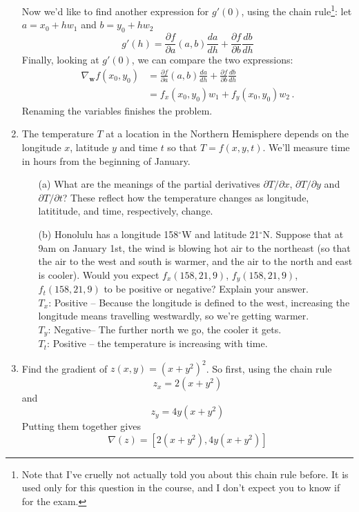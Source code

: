 \documentclass[11pt,a4paper]{scrartcl}
\begin{document}
\begin{enumerate}
Now we'd like to find another expression for $g'(0)$, using the chain rule\footnote{Note that I've cruelly not actually told you about this chain rule before. It is used only for this question in the course, and I don't expect you to know if for the exam.}: let $a = x_0 + hw_1$ and $b = y_0 + hw_2$
\[
    g'(h) = \frac{\partial f}{\partial a}(a,b) \frac{da}{dh}
    + \frac{\partial f}{\partial b} \frac{db}{dh}
\]
Finally, looking at $g'(0)$, we can compare the two expressions:
\begin{align*}
\nabla_{\mathbf{w}}f(x_0,y_0) &=  \frac{\partial f}{\partial a}(a,b) \frac{da}{dh}
    + \frac{\partial f}{\partial b} \frac{db}{dh}\\
    &=  f_x(x_0,y_0) w_1
    + f_y(x_0,y_0) w_2\,.
\end{align*}
Renaming the variables finishes the problem. 

\item 
The temperature $T$ at a location in the Northern Hemisphere depends on the longitude $x$, latitude $y$ and time $t$ so that $T = f(x,y,t)$. We'll measure time in hours from the beginning of January. 
\begin{enumerate}
    \item[(a)] What are the meanings of the partial derivatives $\partial T/\partial x$, $\partial T/\partial y$ and $\partial T/\partial t$?
    These reflect how the temperature changes as longitude, latititude, and time, respectively, change. 
    \item[(b)] Honolulu has a longitude 158$^\circ$W and latitude 21$^\circ$N. Suppose that at 9am on January 1st, the wind is blowing hot air to the northeast (so that the air to the west and south is warmer, and the air to the north and east is cooler). Would you expect $f_x(158,21,9)$, $f_y(158,21,9)$, $f_t(158,21,9)$ to be positive or negative? Explain your answer. 
   \\
   $T_x$: Positive --  Because the longitude is defined to the west, increasing the longitude means travelling westwardly, so we're getting warmer.\\
   $T_y$: Negative-- The further north we go, the cooler it gets.\\
   $T_t$: Positive -- the temperature is increasing with time.

\end{enumerate}

\item Find the gradient of $z(x,y)=(x+y^2)^2$. So first, using the chain rule
  \begin{equation}
    z_x=2(x+y^2)
  \end{equation}
  and
  \begin{equation}
    z_y=4y(x+y^2)
  \end{equation}
  Putting them together gives
  \begin{equation}
    \nabla(z)=[2(x+y^2),4y(x+y^2)]
  \end{equation}


\end{enumerate}
\end{document}

